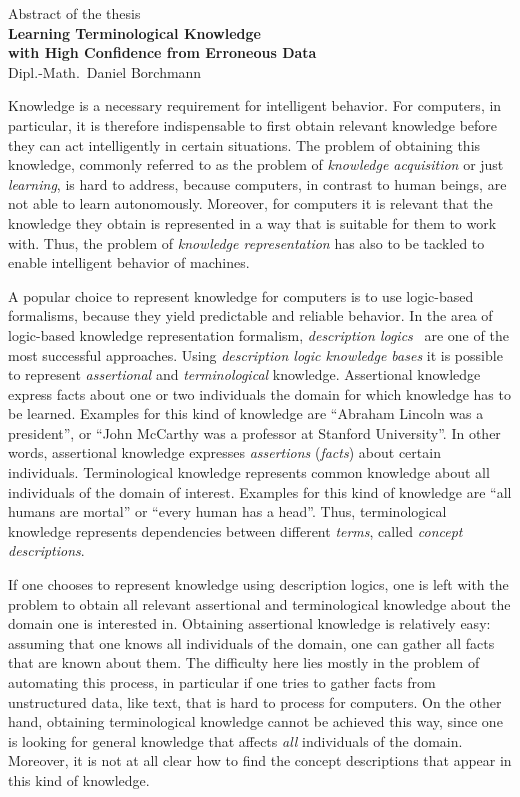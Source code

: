 \documentclass[english,fleqn]{scrartcl}
\begin{document}
\medskip
\begin{center}
  \normalsize Abstract of the thesis\\
  \LARGE\textbf{Learning Terminological Knowledge\\ with High Confidence from Erroneous
    Data}\\
  \bigskip%
  \large Dipl.-Math.\ Daniel Borchmann
\end{center}
\bigskip
\bigskip

\noindent
Knowledge is a necessary requirement for intelligent behavior.  For computers, in
particular, it is therefore indispensable to first obtain relevant knowledge before they
can act intelligently in certain situations.  The problem of obtaining this knowledge,
commonly referred to as the problem of \emph{knowledge acquisition} or just
\emph{learning}, is hard to address, because computers, in contrast to human beings, are
not able to learn autonomously.  Moreover, for computers it is relevant that the knowledge
they obtain is represented in a way that is suitable for them to work with.  Thus, the
problem of \emph{knowledge representation} has also to be tackled to enable intelligent
behavior of machines.

A popular choice to represent knowledge for computers is to use logic-based formalisms,
because they yield predictable and reliable behavior.  In the area of logic-based
knowledge representation formalism, \emph{description logics}~\cite{DLhandbook} are one of
the most successful approaches.  Using \emph{description logic knowledge bases} it is
possible to represent \emph{assertional} and \emph{terminological} knowledge.  Assertional
knowledge express facts about one or two individuals the domain for which knowledge has to
be learned.  Examples for this kind of knowledge are \enquote{Abraham Lincoln was a
  president}, or \enquote{John McCarthy was a professor at Stanford University}.  In other
words, assertional knowledge expresses \emph{assertions} (\emph{facts}) about certain
individuals.  Terminological knowledge represents common knowledge about all individuals
of the domain of interest.  Examples for this kind of knowledge are \enquote{all humans
  are mortal} or \enquote{every human has a head}.  Thus, terminological knowledge
represents dependencies between different \emph{terms}, called \emph{concept
  descriptions}.

If one chooses to represent knowledge using description logics, one is left with the
problem to obtain all relevant assertional and terminological knowledge about the domain
one is interested in.  Obtaining assertional knowledge is relatively easy: assuming that
one knows all individuals of the domain, one can gather all facts that are known about
them.  The difficulty here lies mostly in the problem of automating this process, in
particular if one tries to gather facts from unstructured data, like text, that is hard to
process for computers.  On the other hand, obtaining terminological knowledge cannot be
achieved this way, since one is looking for general knowledge that affects \emph{all}
individuals of the domain.  Moreover, it is not at all clear how to find the concept
descriptions that appear in this kind of knowledge.
\end{document}
